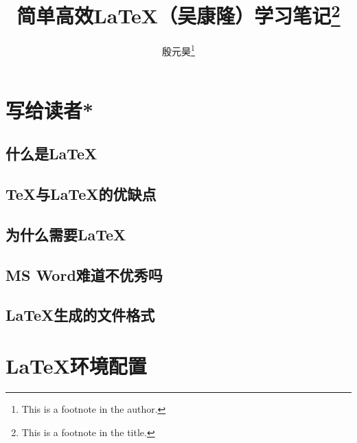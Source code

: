 \documentclass[twoside]{ctexart}
\title{简单高效\LaTeX{}（吴康隆）学习笔记\thanks{This is a footnote in the title.}}
\author{殷元昊\thanks{This is a footnote in the author.}}
\date{}
\begin{document}
\maketitle

\renewcommand{\contentsname}{这是目录}
\tableofcontents

\renewcommand{\listfigurename}{这是插图目录}
\listoffigures

\renewcommand{\listtablename}{这是表格目录}
\listoftables

\section{写给读者*}
    \subsection{什么是\LaTeX}
    \subsection{\TeX 与\LaTeX 的优缺点}
    \subsection{为什么需要\LaTeX}
    \subsection{MS Word难道不优秀吗}
    \subsection{\LaTeX 生成的文件格式}

\section{\LaTeX 环境配置}
\end{document}
